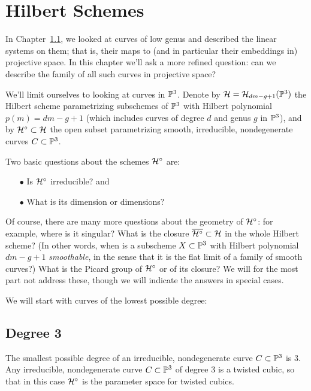 

\chapter{Hilbert Schemes}
\label{HilbertSchemesChapter}

In Chapter~\ref{}, we looked at curves of low genus and described the linear systems on them; that is, their maps to (and in particular their embeddings in) projective space. In this chapter we'll ask a more refined question: can we describe the family of all such curves in projective space?

We'll limit ourselves to looking at curves in ${\mathbb P}^3$. Denote by ${\cal H} = {\cal H}_{dm-g+1}({\mathbb P}^3)$ the Hilbert scheme parametrizing subschemes of ${\mathbb P}^3$ with Hilbert polynomial $p(m) = dm-g+1$ (which includes
curves of degree $d$ and genus $g$ in ${\mathbb P}^3$), and by ${\cal H}^\circ \subset {\cal H}$ the open subset parametrizing smooth, irreducible, nondegenerate curves $C \subset {\mathbb P}^3$. 

Two basic questions about the schemes ${\cal H}^\circ$ are:

\begin{enumerate}
\item[$\bullet$] Is ${\cal H}^\circ$ irreducible? and
\item[$\bullet$]  What is its dimension or dimensions?
\end{enumerate}

Of course, there are many more questions about the geometry of ${\cal H}^\circ$: for example,  where is it singular? What is the closure $\overline{{\cal H}^\circ} \subset {\cal H}$ in the whole Hilbert scheme? (In other words, when is a subscheme $X \subset {\mathbb P}^3$ with Hilbert polynomial $dm-g+1$ \emph{smoothable}, in the sense that it is the flat limit of a family of smooth curves?) What is the Picard group of ${\cal H}^\circ$ or of its closure? We will for the most part not address these, though we will indicate the answers in special cases.

We will start with curves of the lowest possible degree:

\section{Degree 3}

The smallest possible degree of an irreducible, nondegenerate curve $C \subset {\mathbb P}^3$ is 3. Any irreducible, nondegenerate curve $C \subset {\mathbb P}^3$ of degree 3 is a twisted cubic, so that in this case ${\cal H}^\circ$ is the parameter space for twisted cubics.

